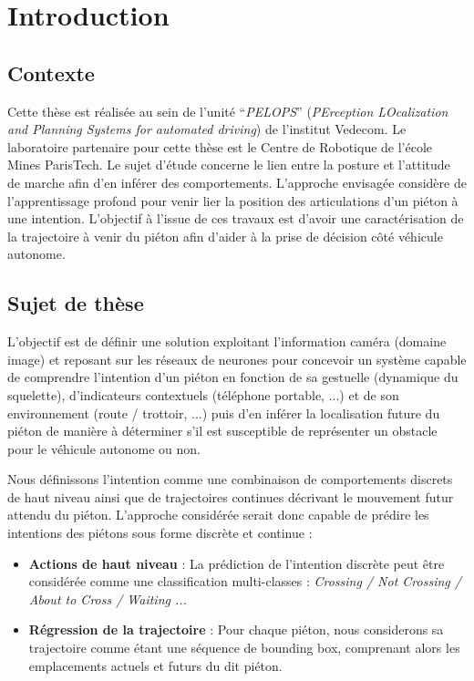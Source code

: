 \clearpage
\chapter{Introduction}
\label{sec:Intro}

\section{Contexte}
Cette thèse est réalisée au sein de l’unité “\textit{PELOPS}” (\textit{PErception LOcalization and Planning Systems for automated driving}) de l'institut Vedecom. Le laboratoire partenaire pour cette thèse est le Centre de Robotique de l'école Mines ParisTech. Le sujet d’étude concerne le lien entre la posture et l’attitude de marche afin d’en inférer des comportements. L’approche envisagée considère de l’apprentissage profond pour venir lier la position des articulations d’un piéton à une intention. L’objectif à l’issue de ces travaux est d’avoir une caractérisation de la trajectoire à venir du piéton afin d’aider à la prise de décision côté véhicule autonome.

\section{Sujet de thèse}
L'objectif est de définir une solution exploitant l’information caméra (domaine image) et reposant sur les réseaux de neurones pour concevoir un système capable de comprendre l’intention d’un piéton en fonction de sa gestuelle (dynamique du squelette), d'indicateurs contextuels (téléphone portable, ...) et de son environnement (route / trottoir, ...) puis d’en inférer la localisation future du piéton de manière à déterminer s’il est susceptible de représenter un obstacle pour le véhicule autonome ou non.

Nous définissons l'intention comme une combinaison de comportements discrets de haut niveau ainsi que de trajectoires continues décrivant le mouvement futur attendu du piéton. L’approche considérée serait donc capable de prédire les intentions des piétons sous forme discrète et continue : 

\begin{itemize}
    \item \textbf{Actions de haut niveau} : La prédiction de l'intention discrète peut être considérée comme une classification multi-classes : \textit{Crossing / Not Crossing / About to Cross / Waiting ...}
    \item \textbf{Régression de la trajectoire} : Pour chaque piéton, nous considerons sa trajectoire comme étant une séquence de bounding box, comprenant alors les emplacements actuels et futurs du dit piéton.
\end{itemize}

